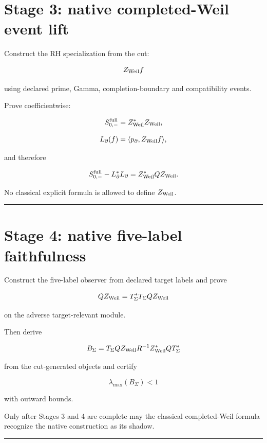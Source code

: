 \hypertarget{stage-3-native-completed-weil-event-lift}{%
\section{Stage 3: native completed-Weil event lift}\label{stage-3-native-completed-weil-event-lift}}

Construct the RH specialization from the cut:

\[
Z_{\rm Weil}f
\]

using declared prime, Gamma, completion-boundary and compatibility events.

Prove coefficientwise:

\[
S_{0,-}^{\rm full}=Z_{\rm Weil}^*Z_{\rm Weil},
\]

\[
L_\partial(f)=\langle p_\partial,Z_{\rm Weil}f\rangle,
\]

and therefore

\[
S_{0,-}^{\rm full}-L_\partial^*L_\partial
=Z_{\rm Weil}^*QZ_{\rm Weil}.
\]

No classical explicit formula is allowed to define \(Z_{\rm Weil}\).

\begin{center}\rule{0.5\linewidth}{0.5pt}\end{center}

\hypertarget{stage-4-native-five-label-faithfulness}{%
\section{Stage 4: native five-label faithfulness}\label{stage-4-native-five-label-faithfulness}}

Construct the five-label observer from declared target labels and prove

\[
QZ_{\rm Weil}
=T_\Sigma^*T_\Sigma QZ_{\rm Weil}
\]

on the adverse target-relevant module.

Then derive

\[
B_\Sigma
=T_\Sigma QZ_{\rm Weil}
R^{-1}
Z_{\rm Weil}^*QT_\Sigma^*
\]

from the cut-generated objects and certify

\[
\lambda_{\max}(B_\Sigma)<1
\]

with outward bounds.

Only after Stages 3 and 4 are complete may the classical completed-Weil formula
recognize the native construction as its shadow.

\begin{center}\rule{0.5\linewidth}{0.5pt}\end{center}

